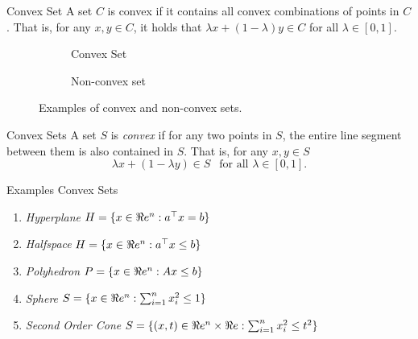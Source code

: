 \begin{definition}{Convex Set}{}
A set $C$ is convex if it contains all convex combinations of points in $C$.  That is, for any $x,y \in C$, it holds that $ \lambda x + (1-\lambda) y \in C$ for all $\lambda \in [0,1]$.
\end{definition}
\begin{figure}[h]
  \begin{subfigure}[b]{0.45\textwidth}
    \centering
    \caption{Convex Set}
    \label{a}
  \end{subfigure}
  \begin{subfigure}[b]{0.45\textwidth}
    \centering
    \caption{Non-convex set}
    \label{b}
  \end{subfigure}
\caption{Examples of convex and non-convex sets.}
\label{fig:convexity}
\end{figure}


\begin{definition}{Convex Sets}{}
A set $S$ is \emph{convex} if for any two points in $S$, the entire line segment between them is also contained in $S$.
That is, for any $x,y \in S$
$$
\lambda x + (1-\lambda y) \in S \ \ \text{ for all } \lambda \in [0,1].
$$
\end{definition}


    


Examples Convex Sets
\begin{enumerate}
    \item \emph{Hyperplane}  $H = \{x \in \Re e^n : a^\top x = b\}$
    \item \emph{Halfspace}   $H = \{ x \in \Re e^n : a^\top x \leq b\}$
    \item \emph{Polyhedron}  $P = \{x \in \Re e^n : Ax \leq b\}$
    \item \emph{Sphere} $S = \{ x \in \Re e^n : \sum_{i=1}^n x_i^2 \leq 1\}$
    \item \emph{Second Order Cone} $S = \{ (x,t) \in \Re e^n \times \Re e : \sum_{i=1}^n x_i^2 \leq t^2 \}$
\end{enumerate}





